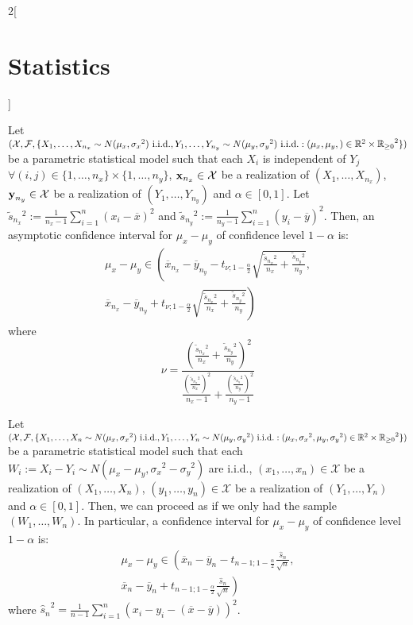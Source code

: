 \documentclass[../../../main.tex]{subfiles}
\begin{document}
\begin{multicols}{2}[\section{Statistics}]
\begin{proposition}
  \end{proposition}
  \begin{proposition}
    Let $(\mathcal{X},\mathcal{F},\{X_1,\ldots,X_{n_x}\sim N(\mu_x,{\sigma_x}^2)\text{ i.i.d.},Y_1,\ldots,Y_{n_y}\sim N(\mu_y,{\sigma_y}^2)\text{ i.i.d.}:(\mu_x,\mu_y,)\in\mathbb{R}^2\times{\ensuremath{\mathbb{R}}_{\geq 0}}^2\})$ be a parametric statistical model such that each $X_i$ is independent of $Y_j$ $\forall (i,j)\in\{1,\ldots,n_x\}\times\{1,\ldots,n_y\}$, $\boldsymbol{\mathrm{x}}_{n_x}\in\mathcal{X}$ be a realization of $(X_1,\ldots,X_{n_x})$, $\boldsymbol{\mathrm{y}}_{n_y}\in\mathcal{X}$ be a realization of $(Y_1,\ldots,Y_{n_y})$ and $\alpha\in[0,1]$. Let $\tilde{s}_{n_x}{}^2:=\frac{1}{n_x-1}\sum_{i=1}^n{(x_i-\overline{x})}^2$ and $\tilde{s}_{n_y}{}^2:=\frac{1}{n_y-1}\sum_{i=1}^n{(y_i-\overline{y})}^2$. Then, an asymptotic confidence interval for $\mu_x-\mu_y$ of confidence level $1-\alpha$ is:
    \begin{multline*}
      \mu_x-\mu_y\in\left(\overline{x}_{n_x}-\overline{y}_{n_y}-t_{\nu;1-\frac{\alpha}{2}}\sqrt{\frac{\tilde{s}_{n_x}{}^2}{n_x}+\frac{\tilde{s}_{n_y}{}^2}{n_y}},\right.\\\left.\overline{x}_{n_x}-\overline{y}_{n_y}+t_{\nu;1-\frac{\alpha}{2}}\sqrt{\frac{\tilde{s}_{n_x}{}^2}{n_x}+\frac{\tilde{s}_{n_y}{}^2}{n_y}}\right)
    \end{multline*}
    where $$\nu=\frac{\displaystyle{\left(\frac{\tilde{s}_{n_x}{}^2}{n_x}+\frac{\tilde{s}_{n_y}{}^2}{n_y}\right)}^2}{\displaystyle\frac{{\left(\frac{\tilde{s}_{n_x}{}^2}{n_x}\right)}^2}{n_x-1}+\frac{{\left(\frac{\tilde{s}_{n_y}{}^2}{n_y}\right)}^2}{n_y-1}}$$
  \end{proposition}
  \begin{proposition}
    Let $(\mathcal{X},\mathcal{F},\{X_1,\ldots,X_{n}\sim N(\mu_x,{\sigma_x}^2)\text{ i.i.d.},Y_1,\ldots,Y_{n}\sim N(\mu_y,{\sigma_y}^2)\text{ i.i.d.}:(\mu_x,{\sigma_x}^2,\mu_y,{\sigma_y}^2)\in\mathbb{R}^2\times{\ensuremath{\mathbb{R}}_{\geq 0}}^2\})$ be a parametric statistical model such that each $W_i:=X_i-Y_i\sim N(\mu_x-\mu_y,{\sigma_x}^2-{\sigma_y}^2)$ are i.i.d., $(x_1,\ldots,x_n)\in\mathcal{X}$ be a realization of $(X_1,\ldots,X_{n})$, $(y_1,\ldots,y_n)\in\mathcal{X}$ be a realization of $(Y_1,\ldots,Y_{n})$ and $\alpha\in[0,1]$. Then, we can proceed as if we only had the sample $(W_1,\ldots,W_n)$. In particular, a confidence interval for $\mu_x-\mu_y$ of confidence level $1-\alpha$ is:
    \begin{multline*}
      \mu_x-\mu_y\in\left(\overline{x}_{n}-\overline{y}_{n}-t_{n-1;1-\frac{\alpha}{2}}\frac{\hat{s}_n}{\sqrt{n}},\right.\\\left.\overline{x}_{n}-\overline{y}_{n}+t_{n-1;1-\frac{\alpha}{2}}\frac{\hat{s}_n}{\sqrt{n}}\right)
    \end{multline*}
    where ${\hat{s}_n}^2=\frac{1}{n-1}\sum_{i=1}^n{(x_i-y_i-(\overline{x}-\overline{y}))}^2$.
  \end{proposition}

\end{multicols}
\end{document}
